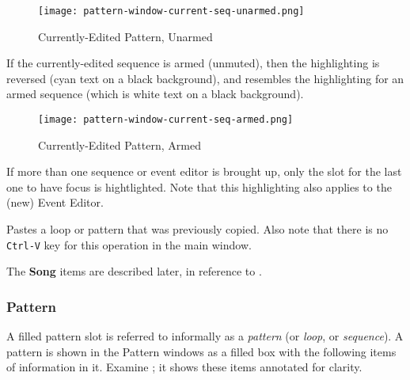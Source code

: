 \begin{figure}[H]
   \centering 
   \texttt{[image: pattern-window-current-seq-unarmed.png]}
   \caption{Currently-Edited Pattern, Unarmed}
   \label{fig:pattern_window_current_seq_unarmed}
\end{figure}

   If the currently-edited sequence is armed (unmuted), then the highlighting
   is reversed (cyan text on a black background), and resembles the
   highlighting for an armed sequence (which is white text on a black
   background).

\begin{figure}[H]
   \centering 
   \texttt{[image: pattern-window-current-seq-armed.png]}
   \caption{Currently-Edited Pattern, Armed}
   \label{fig:pattern_window_current_seq_armed}
\end{figure}

   If more than one sequence or event editor is brought up, only the slot for
   the last one to have focus is hightlighted.
   Note that this highlighting also applies to the (new) Event Editor.

   Pastes a loop or pattern that was previously copied.
   Also note that there is no \texttt{Ctrl-V} key for this operation in the
   main window.

   The \textbf{Song} items are described later, in reference to
   .
   
\subsubsection{Pattern}
\label{subsubsec:seq64_patterns_pattern_filled}

   A filled pattern slot is referred to informally as a \textsl{pattern}
   (or \textsl{loop}, or \textsl{sequence}).
   A pattern is shown in the Pattern windows as a filled box with the
   following items of information in it.
   Examine ; it shows
   these items annotated for clarity.

